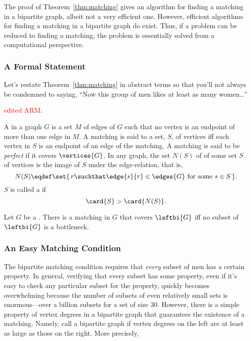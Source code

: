 The proof of Theorem~\ref{thm:matching} gives an algorithm for finding
a matching in a bipartite graph, albeit not a very efficient one.
However, efficient algorithms for finding a matching in a bipartite
graph do exist.  Thus, if a problem can be reduced to finding a
matching, the problem is essentially solved from a computational
perspective.

\subsubsection{A Formal Statement}

Let's restate Theorem~\ref{thm:matching} in abstract terms so that
you'll not always be condemned to saying, ``Now this group of men
likes at least as many women\dots''

\begin{definition}\label{def:5K}
\begin{editingnotes}
\textcolor{red}{edited ARM}:
\end{editingnotes}
 A  in a graph $G$ is a set $M$
of edges of $G$ such that no vertex is an endpoint of more than one
edge in $M$.  A matching is said to  
 a set, $S$, of vertices iff each vertex in $S$ is
an endpoint of an edge of the matching.  A matching is said to be
\emph{perfect}  if it covers
$\vertices{G}$.  In any graph, the set $N(S)$ of  of
some set $S$ of vertices is the image of $S$ under the edge-relation,
\iffalse set of all vertices adjacent to some vertex in $S$.  \fi that
is,
\[
N(S) \eqdef \set{\,r \suchthat \edge{s}{r} \in \edges{G} \text{ for
    some } s \in S\,}.
\]
$S$ is called a  if
\[
\card{S} > \card{N(S)}.
\]
\end{definition}

\begin{theorem}\label{thm:halls}
  Let $G$ be a .  There is a matching in $G$ that
  covers $\leftbi{G}$ iff no subset of $\leftbi{G}$ is a bottleneck.
\end{theorem}

\subsubsection{An Easy Matching Condition}

The bipartite matching condition requires that \emph{every} subset of
men has a certain property.  In general, verifying that every subset
has some property, even if it's easy to check any particular subset
for the property, quickly becomes overwhelming because the number of
subsets of even relatively small sets is enormous---over a billion
subsets for a set of size 30.  However, there is a simple property of
vertex degrees in a bipartite graph that guarantees the existence of a
matching.  Namely, call a bipartite graph 
if vertex degrees on the left are at least as large as those on the
right.  More precisely,

